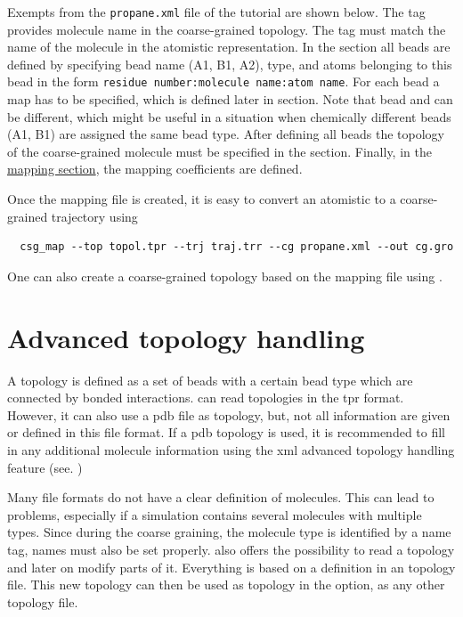 Exempts from the \texttt{propane.xml} file of the tutorial are shown below. The  tag provides molecule name in the coarse-grained topology. The  tag must match the name of the molecule in the atomistic representation. In the  section all beads are defined by specifying bead name (A1, B1, A2), type, and atoms belonging to this bead in the form \texttt{residue number:molecule name:atom name}. For each bead a map has to be specified, which is defined later in  section. Note that bead  and  can be different, which might be useful in a situation when chemically different beads (A1, B1) are assigned the same bead type. After defining all beads the topology of the coarse-grained molecule must be specified in the  section. Finally, in the \hyperlink{\mapref{topology.cg_beads.cg_bead.mapping}}{mapping section}, the mapping coefficients are defined.

Once the mapping file is created, it is easy to convert an atomistic to a coarse-grained trajectory using 
\begin{verbatim}
  csg_map --top topol.tpr --trj traj.trr --cg propane.xml --out cg.gro
\end{verbatim}
One can also create a coarse-grained topology based on the mapping file using .





\section{Advanced topology handling}
\label{sec:adv_topology}


A topology is defined as a set of beads with a certain bead type which are connected by bonded interactions.
\votca can read topologies in the \gromacs tpr format. However, it can also use a pdb file as topology, but, not all information are given or defined in this file format. If a pdb topology is used, it is recommended to fill in any additional molecule information using the xml advanced topology handling feature (see. )


Many file formats do not have a clear definition of molecules. This can lead to problems, especially if a simulation contains several molecules with multiple types. Since during the coarse graining, the molecule type is identified by a name tag, names must also be set properly. \votca also offers the possibility to read a topology and later on modify parts of it. Everything is based on a definition in an \xml topology file. This new \xml topology can then be used as topology in the  option, as any other topology file.

